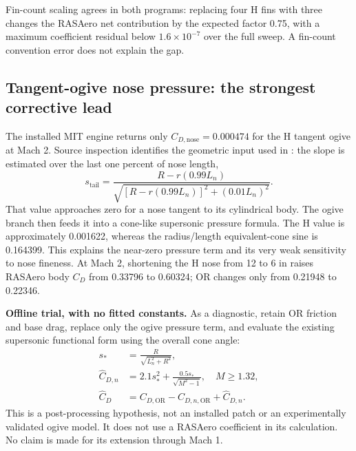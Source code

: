 \documentclass[oneside,openany]{amsdtx}
\begin{document}
Fin-count scaling agrees in both programs: replacing four H fins with three changes the RASAero net contribution by the expected factor 0.75, with a maximum coefficient residual below $1.6\times10^{-7}$ over the full sweep. A fin-count convention error does not explain the gap.



\clearpage\subsection{Tangent-ogive nose pressure: the strongest corrective lead}
The installed MIT engine returns only $C_{D,\mathrm{nose}}=0.000474$ for the H tangent ogive at Mach 2. Source inspection identifies the geometric input used in : the slope is estimated over the last one percent of nose length,
\begin{equation}
 s_{\mathrm{tail}}=\frac{R-r(0.99L_n)}{\sqrt{[R-r(0.99L_n)]^2+(0.01L_n)^2}}.
\end{equation}
That value approaches zero for a nose tangent to its cylindrical body. The ogive branch then feeds it into a cone-like supersonic pressure formula. The H value is approximately 0.001622, whereas the radius/length equivalent-cone sine is 0.164399. This explains the near-zero pressure term and its very weak sensitivity to nose fineness. At Mach 2, shortening the H nose from 12 to 6 in raises RASAero body $C_D$ from 0.33796 to 0.60324; OR changes only from 0.21948 to 0.22346.

\textbf{Offline trial, with no fitted constants.} As a diagnostic, retain OR friction and base drag, replace only the ogive pressure term, and evaluate the existing supersonic functional form using the overall cone angle:
\begin{align}
 s_*&=\frac{R}{\sqrt{L_n^2+R^2}},\\
 \widehat C_{D,n}&=2.1s_*^2+\frac{0.5s_*}{\sqrt{M^2-1}},\quad M\geq1.32,\\
 \widehat C_D&=C_{D,\mathrm{OR}}-C_{D,n,\mathrm{OR}}+\widehat C_{D,n}.
\end{align}
This is a post-processing hypothesis, not an installed patch or an experimentally validated ogive model. It does not use a RASAero coefficient in its calculation. No claim is made for its extension through Mach 1.
\end{document}
